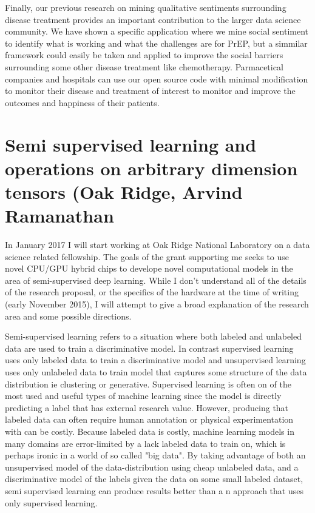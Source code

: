Finally, our previous research on mining qualitative sentiments surrounding disease treatment provides an important contribution to the larger data science community. We have shown a specific application where we mine social sentiment to identify what is working and what the challenges are for PrEP, but a simmilar framework could easily be taken and applied to improve the social barriers surrounding some other disease treatment like chemotherapy. Parmacetical companies and hospitals can use our open source code with minimal modification to monitor their disease and treatment of interest to monitor and improve the outcomes and happiness of their patients.


\section{Semi supervised learning and operations on arbitrary dimension tensors (Oak Ridge, Arvind Ramanathan}

In January 2017 I will start working at Oak Ridge National Laboratory on a data science related fellowship. The goals of the grant supporting me seeks to use novel CPU/GPU hybrid chips to develope novel computational models in the area of semi-supervised deep learning. While I don't understand all of the details of the research proposal, or the specifics of the hardware at the time of writing (early November 2015), I will attempt to give a broad explanation of the research area and some possible directions.

Semi-supervised learning refers to a situation where both labeled and unlabeled data are used to train a discriminative model\cite{zhu2011semi}. In contrast supervised learning uses only labeled data to train a discriminative model and unsupervised learning uses only unlabeled data to train model that captures some structure of the data distribution ie clustering or generative. Supervised learning is often on of the most used and useful types of machine learning since the model is directly predicting a label that has external research value. However, producing that labeled data can often require human annotation or physical experimentation with can be costly. Because labeled data is costly, machine learning models in many domains are error-limited by a lack labeled data to train on\cite{guillaumin2010multimodal}, which is perhaps ironic in a world of so called "big data". By taking advantage of both an unsupervised model of the data-distribution using cheap unlabeled data, and a discriminative model of the labels given the data on some small labeled dataset, semi supervised learning can produce results better than a n approach that uses only supervised learning.

